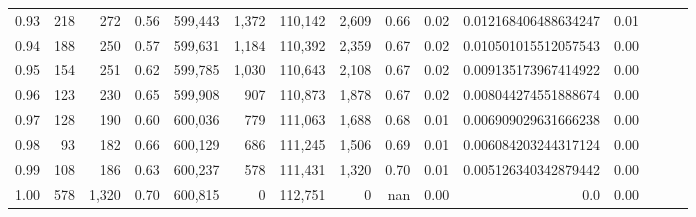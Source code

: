 \begin{tabular}{rrrrrrrrrrrrrrr}
0.93 &     218 &    272 &  0.56 &  599,443 &    1,372 &  110,142 &    2,609 &  0.66 &  0.02 &  0.012168406488634247 &      0.01 \\
0.94 &     188 &    250 &  0.57 &  599,631 &    1,184 &  110,392 &    2,359 &  0.67 &  0.02 &  0.010501015512057543 &      0.00 \\
0.95 &     154 &    251 &  0.62 &  599,785 &    1,030 &  110,643 &    2,108 &  0.67 &  0.02 &  0.009135173967414922 &      0.00 \\
0.96 &     123 &    230 &  0.65 &  599,908 &      907 &  110,873 &    1,878 &  0.67 &  0.02 &  0.008044274551888674 &      0.00 \\
0.97 &     128 &    190 &  0.60 &  600,036 &      779 &  111,063 &    1,688 &  0.68 &  0.01 &  0.006909029631666238 &      0.00 \\
0.98 &      93 &    182 &  0.66 &  600,129 &      686 &  111,245 &    1,506 &  0.69 &  0.01 &  0.006084203244317124 &      0.00 \\
0.99 &     108 &    186 &  0.63 &  600,237 &      578 &  111,431 &    1,320 &  0.70 &  0.01 &  0.005126340342879442 &      0.00 \\
1.00 &     578 &  1,320 &  0.70 &  600,815 &        0 &  112,751 &        0 &   nan &  0.00 &                   0.0 &      0.00 \\
\bottomrule
\end{tabular}
